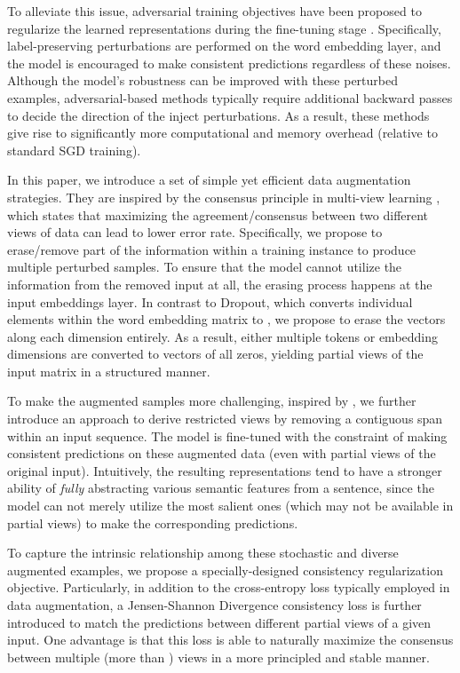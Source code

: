 \documentclass[11pt,a4paper]{article}
\begin{document}
To alleviate this issue, adversarial training objectives have been proposed to regularize the learned representations during the fine-tuning stage \cite{zhu2019freelb, liu2020adversarial, jiang2019smart}. Specifically, label-preserving perturbations are performed on the word embedding layer, and the model is encouraged to make consistent predictions regardless of these noises. Although the model's robustness can be improved with these perturbed examples, adversarial-based methods typically require additional backward passes to decide the direction of the inject perturbations. 
As a result, these methods give rise to significantly more computational and memory overhead (relative to standard SGD training).


In this paper, we introduce a set of simple yet efficient data augmentation strategies. They are inspired by the consensus principle in multi-view learning \cite{Blum1998CombiningLA, Xu2013ASO, Clark2018SemiSupervisedSM}, which states that maximizing the agreement/consensus between two different views of data can lead to lower error rate.
Specifically, we propose to erase/remove part of the information within a training instance to produce multiple perturbed samples. 
To ensure that the model cannot utilize the information from the removed input at all, the erasing process happens at the input embeddings layer.
In contrast to Dropout, which converts individual elements within the word embedding matrix to , we propose to erase the vectors along each dimension entirely.
As a result, either multiple tokens or embedding dimensions are converted to vectors of all zeros, yielding partial views of the input matrix in a structured manner.  

To make the augmented samples more challenging, inspired by \cite{joshi2019spanbert}, we further introduce an approach to derive restricted views by removing a contiguous span within an input sequence.
The model is fine-tuned with the constraint of making consistent predictions on these augmented data (even with partial views of the original input).
Intuitively, the resulting representations tend to have a stronger ability of \emph{fully} abstracting various semantic features from a sentence, since the model can not merely utilize the most salient ones (which may not be available in partial views) to make the corresponding predictions.

To capture the intrinsic relationship among these stochastic and diverse augmented examples, we propose a specially-designed consistency regularization objective. Particularly, in addition to the cross-entropy loss typically employed in data augmentation, a Jensen-Shannon Divergence consistency loss is further introduced to match the predictions between different partial views of a given input. One advantage is that this loss is able to naturally maximize the consensus between multiple (more than ) views in a more principled and stable manner. 
\end{document}
